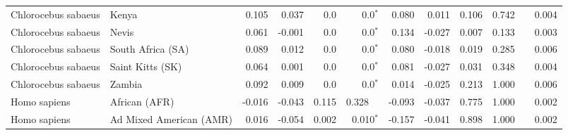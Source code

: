 \begin{center}
\begin{adjustbox}{width = 1\textwidth}
\begin{tabular}{|l|l|r|r|r|r|r|r|r|r|r|}
 Chlorocebus sabaeus &                           Kenya &                 0.105 &                                0.037 &                  0.0 &                             0.0$\bm{^*}$ &                 0.080 &                                0.011 &                0.106 &                                  0.742~~ &              0.004 \\
 Chlorocebus sabaeus &                           Nevis &                 0.061 &                               -0.001 &                  0.0 &                             0.0$\bm{^*}$ &                 0.134 &                               -0.027 &                0.007 &                                  0.133~~ &              0.003 \\
 Chlorocebus sabaeus &               South Africa (SA) &                 0.089 &                                0.012 &                  0.0 &                             0.0$\bm{^*}$ &                 0.080 &                               -0.018 &                0.019 &                                  0.285~~ &              0.006 \\
 Chlorocebus sabaeus &                Saint Kitts (SK) &                 0.064 &                                0.001 &                  0.0 &                             0.0$\bm{^*}$ &                 0.081 &                               -0.027 &                0.031 &                                  0.348~~ &              0.004 \\
 Chlorocebus sabaeus &                          Zambia &                 0.092 &                                0.009 &                  0.0 &                             0.0$\bm{^*}$ &                 0.014 &                               -0.025 &                0.213 &                                  1.000~~ &              0.006 \\
        Homo sapiens &                   African (AFR) &                -0.016 &                               -0.043 &                0.115 &                                  0.328~~ &                -0.093 &                               -0.037 &                0.775 &                                  1.000~~ &              0.002 \\
        Homo sapiens &         Ad Mixed American (AMR) &                 0.016 &                               -0.054 &                0.002 &                           0.010$\bm{^*}$ &                -0.157 &                               -0.041 &                0.898 &                                  1.000~~ &              0.002 \\

\end{tabular}
\end{adjustbox}
\end{center}
